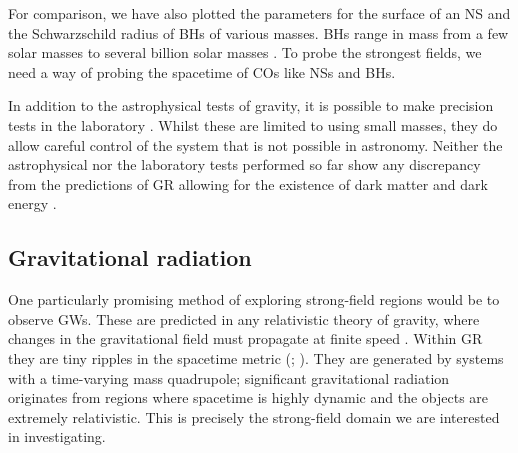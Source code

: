 For comparison, we have also plotted the parameters for the surface of an NS and the Schwarzschild radius of BHs of various masses. BHs range in mass from a few solar masses \citep{Ozel2010} to several billion solar masses \citep{Hlavacek-Larrondo2012}. To probe the strongest fields, we need a way of probing the spacetime of COs like NSs and BHs.

In addition to the astrophysical tests of gravity, it is possible to make precision tests in the laboratory \citep{Kapner2007a,Adelberger2009,Wagner2012}. Whilst these are limited to using small masses, they do allow careful control of the system that is not possible in astronomy. Neither the astrophysical nor the laboratory tests performed so far show any discrepancy from the predictions of GR allowing for the existence of dark matter and dark energy \citep{Will2006}. 

\subsection{Gravitational radiation}

One particularly promising method of exploring strong-field regions would be to observe GWs. These are predicted in any relativistic theory of gravity, where changes in the gravitational field must propagate at finite speed \citep{Schutz1984}. Within GR they are tiny ripples in the spacetime metric (\citealt[section 35.1]{Misner1973}; \citealt[section 107]{Landau1975}). They are generated by systems with a time-varying mass quadrupole; significant gravitational radiation originates from regions where spacetime is highly dynamic and the objects are extremely relativistic. This is precisely the strong-field domain we are interested in investigating.

